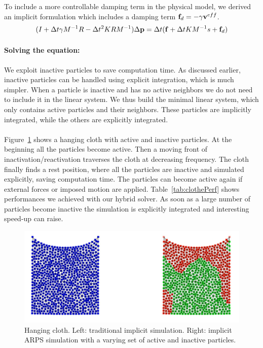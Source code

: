 To include a more controllable damping term in the physical model, we derived an implicit formulation which includes a damping term $\mathbf{f}_{d} = -\gamma \mathbf{v}^{eff}$.
\begin{equation}
	\label{eq:arpsLinearSystemDamped}
	( I + \Delta t \gamma M^{-1}R -\Delta t^{2}KRM^{-1} ) \Delta \mathbf{p} = \Delta t( \mathbf{f} + \Delta t KM^{-1}s + \mathbf{f}_{d})
\end{equation}

\paragraph*{Solving the equation:}
We exploit inactive particles to save computation time.
As discussed earlier, inactive particles can be handled using explicit integration, which is much simpler.
When a particle is inactive and has no active neighbors we do not need to include it in the linear system.
We thus build the minimal linear system, which only contains active particles and their neighbors.
These particles are implicitly integrated, while the others are explicitly integrated.
\paragraph*{}
Figure~\ref{fig:clothARPS} shows a hanging cloth with active and inactive particles.
At the beginning all the particles become active. Then a moving front of inactivation/reactivation traverses the cloth at decreasing frequency. The cloth finally finds a rest position, where all the particles are inactive and simulated explicitly, saving computation time. The particles can become active again if external forces or imposed motion are applied.
Table~\ref{tab:clothePerf} shows performances we achieved with our hybrid solver.
As soon as a large number of particles become inactive the simulation is explicitly integrated and interesting speed-up can raise.

\begin{figure}[!h]
	\centering
	\includegraphics[width=0.8\linewidth]{images/arps-vriphys2013/Square3.jpg}
	\caption[ARPS: ARPS cloth simulation]{\label{fig:clothARPS} Hanging cloth. Left: traditional implicit simulation. Right: implicit ARPS simulation with a varying set of active and inactive particles. }
\end{figure}


